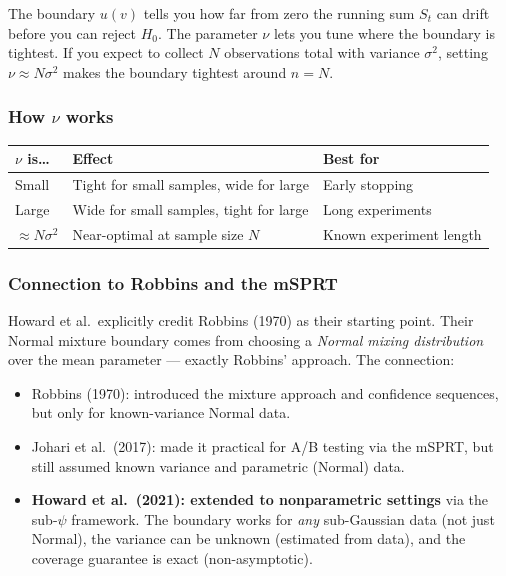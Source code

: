 \documentclass[12pt, a4paper]{article}
\begin{document}
\begin{plainlanguage}
The boundary $u(v)$ tells you how far from zero the running sum $S_t$ can
drift before you can reject $H_0$.  The parameter $\nu$ lets you tune where
the boundary is tightest.  If you expect to collect $N$ observations total with
variance $\sigma^2$, setting $\nu \approx N\sigma^2$ makes the boundary
tightest around $n = N$.
\end{plainlanguage}

\subsubsection*{How $\nu$ works}

\begin{center}
\begin{tabular}{@{} l l l @{}}
\toprule
$\nu$ is\ldots & \textbf{Effect} & \textbf{Best for} \\
\midrule
Small & Tight for small samples, wide for large & Early stopping \\
Large & Wide for small samples, tight for large & Long experiments \\
$\approx N\sigma^2$ & Near-optimal at sample size $N$ & Known experiment length \\
\bottomrule
\end{tabular}
\end{center}

\subsubsection*{Connection to Robbins and the mSPRT}

Howard et al.\ explicitly credit Robbins (1970) as their starting point.
Their Normal mixture boundary comes from choosing a \emph{Normal mixing
distribution} over the mean parameter --- exactly Robbins' approach.  The
connection:
\begin{itemize}[nosep]
  \item Robbins (1970): introduced the mixture approach and confidence
        sequences, but only for known-variance Normal data.
  \item Johari et al.\ (2017): made it practical for A/B testing via the
        mSPRT, but still assumed known variance and parametric (Normal) data.
  \item \textbf{Howard et al.\ (2021): extended to nonparametric settings}
        via the sub-$\psi$ framework.  The boundary works for \emph{any}
        sub-Gaussian data (not just Normal), the variance can be unknown
        (estimated from data), and the coverage guarantee is exact
        (non-asymptotic).
\end{itemize}
\end{document}

